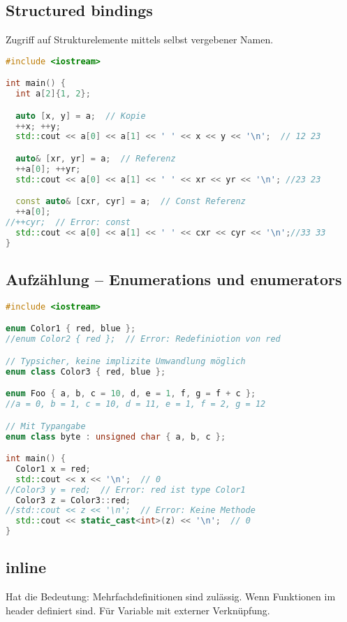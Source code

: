 \subsection{Structured bindings}

Zugriff auf Strukturelemente mittels selbst vergebener Namen.

\begin{lstlisting}[language=C++]
#include <iostream>

int main() {
  int a[2]{1, 2};

  auto [x, y] = a;  // Kopie
  ++x; ++y;
  std::cout << a[0] << a[1] << ' ' << x << y << '\n';  // 12 23

  auto& [xr, yr] = a;  // Referenz
  ++a[0]; ++yr;
  std::cout << a[0] << a[1] << ' ' << xr << yr << '\n'; //23 23

  const auto& [cxr, cyr] = a;  // Const Referenz
  ++a[0];
//++cyr;  // Error: const
  std::cout << a[0] << a[1] << ' ' << cxr << cyr << '\n';//33 33
}
\end{lstlisting}

\subsection{Aufzählung -- Enumerations und enumerators}

\begin{lstlisting}[language=C++]
#include <iostream>

enum Color1 { red, blue };
//enum Color2 { red };  // Error: Redefiniotion von red

// Typsicher, keine implizite Umwandlung möglich
enum class Color3 { red, blue };

enum Foo { a, b, c = 10, d, e = 1, f, g = f + c };
//a = 0, b = 1, c = 10, d = 11, e = 1, f = 2, g = 12

// Mit Typangabe
enum class byte : unsigned char { a, b, c };

int main() {
  Color1 x = red;
  std::cout << x << '\n';  // 0
//Color3 y = red;  // Error: red ist type Color1
  Color3 z = Color3::red;
//std::cout << z << '\n';  // Error: Keine Methode
  std::cout << static_cast<int>(z) << '\n';  // 0
}
\end{lstlisting}

\subsection{inline}

Hat die Bedeutung: Mehrfachdefinitionen sind zulässig. Wenn Funktionen im header
definiert sind. Für Variable mit externer Verknüpfung.

